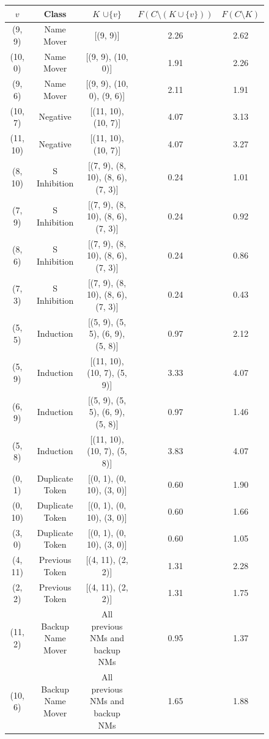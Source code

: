 \begin{figure}
\centering
\begin{tabular}{ |c|c|c|c|c| } 
\hline
\textbf{$v$} & Class & \textbf{$K$} $\cup \{v\}$ & $F( C \setminus (K \cup \{v\}) )$ & $F( C \setminus K )$ \\ 
\hline \hline

(9, 9) & Name Mover & [(9, 9)] & 2.26 & 2.62 \\
\hline
(10, 0) & Name Mover & [(9, 9), (10, 0)] & 1.91 & 2.26 \\
\hline
(9, 6) & Name Mover & [(9, 9), (10, 0), (9, 6)] & 2.11 & 1.91 \\
\hline
(10, 7) & Negative & [(11, 10), (10, 7)] & 4.07 & 3.13 \\
\hline
(11, 10) & Negative & [(11, 10), (10, 7)] & 4.07 & 3.27 \\
\hline
(8, 10) & S Inhibition & [(7, 9), (8, 10), (8, 6), (7, 3)] & 0.24 & 1.01 \\
\hline
(7, 9) & S Inhibition & [(7, 9), (8, 10), (8, 6), (7, 3)] & 0.24 & 0.92 \\
\hline
(8, 6) & S Inhibition & [(7, 9), (8, 10), (8, 6), (7, 3)] & 0.24 & 0.86 \\
\hline
(7, 3) & S Inhibition & [(7, 9), (8, 10), (8, 6), (7, 3)] & 0.24 & 0.43 \\
\hline
(5, 5) & Induction & [(5, 9), (5, 5), (6, 9), (5, 8)] & 0.97 & 2.12 \\
\hline
(5, 9) & Induction & [(11, 10), (10, 7), (5, 9)] & 3.33 & 4.07 \\
\hline
(6, 9) & Induction & [(5, 9), (5, 5), (6, 9), (5, 8)] & 0.97 & 1.46 \\
\hline
(5, 8) & Induction & [(11, 10), (10, 7), (5, 8)] & 3.83 & 4.07 \\
\hline
(0, 1) & Duplicate Token & [(0, 1), (0, 10), (3, 0)] & 0.60 & 1.90 \\
\hline
(0, 10) & Duplicate Token & [(0, 1), (0, 10), (3, 0)] & 0.60 & 1.66 \\
\hline
(3, 0) & Duplicate Token & [(0, 1), (0, 10), (3, 0)] & 0.60 & 1.05 \\
\hline
(4, 11) & Previous Token & [(4, 11), (2, 2)] & 1.31 & 2.28 \\
\hline
(2, 2) & Previous Token & [(4, 11), (2, 2)] & 1.31 & 1.75 \\
\hline
(11, 2) & Backup Name Mover & All previous NMs and backup NMs & 0.95 & 1.37 \\
\hline
(10, 6) & Backup Name Mover & All previous NMs and backup NMs & 1.65 & 1.88 \\

\end{tabular}
\end{figure}
